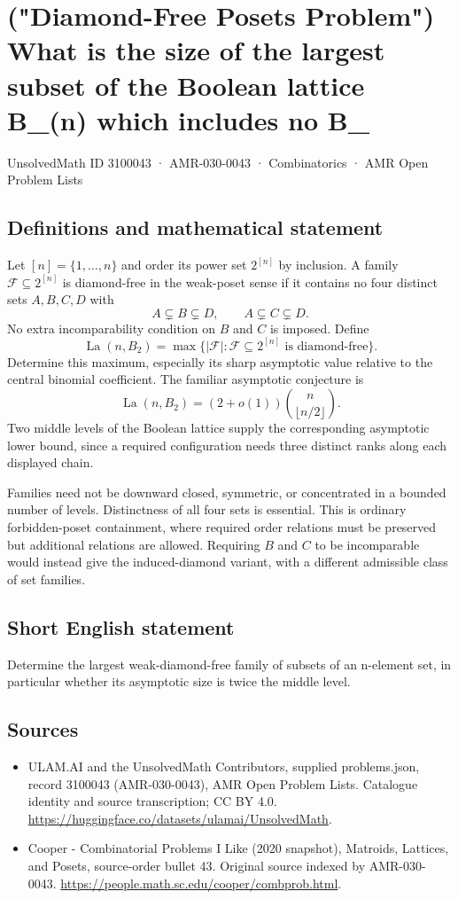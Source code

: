 \documentclass[11pt,a4paper]{article}
\begin{document}
\section*{("Diamond-Free Posets Problem") What is the size of the largest subset of the Boolean lattice B\_(n) which includes no B\_}\label{3100043}
{\small UnsolvedMath ID 3100043 · AMR-030-0043 · Combinatorics · AMR Open Problem Lists}
\subsection{Definitions and mathematical statement}
Let $[n]=\{1,\ldots,n\}$ and order its power set $2^{[n]}$ by
inclusion. A family $\mathcal F\subseteq2^{[n]}$ is diamond-free
in the weak-poset sense if it contains no four distinct sets
$A,B,C,D$ with
\[
                 A\subsetneq B\subsetneq D,
              \qquad A\subsetneq C\subsetneq D.
\]
No extra incomparability condition on $B$ and $C$ is imposed.
Define
\[
 \operatorname{La}(n,B_2)
   =\max\{|\mathcal F|:\mathcal F\subseteq2^{[n]}
                              \text{ is diamond-free}\}.
\]
Determine this maximum, especially its sharp asymptotic value
relative to the central binomial coefficient. The familiar
asymptotic conjecture is
\[
      \operatorname{La}(n,B_2)
              =(2+o(1))\binom n{\lfloor n/2\rfloor}.
\]
Two middle levels of the Boolean lattice supply the corresponding
asymptotic lower bound, since a required configuration needs
three distinct ranks along each displayed chain.

Families need not be downward closed, symmetric, or concentrated
in a bounded number of levels. Distinctness of all four sets is
essential. This is ordinary forbidden-poset containment, where
required order relations must be preserved but additional
relations are allowed. Requiring $B$ and $C$ to be incomparable
would instead give the induced-diamond variant, with a different
admissible class of set families.
\subsection{Short English statement}
Determine the largest weak-diamond-free family of subsets of an n-element set, in particular whether its asymptotic size is twice the middle level.
\subsection{Sources}
\begin{itemize}
\item[S1] ULAM.AI and the UnsolvedMath Contributors, supplied problems.json, record 3100043 (AMR-030-0043), AMR Open Problem Lists. Catalogue identity and source transcription; CC BY 4.0.
\url{https://huggingface.co/datasets/ulamai/UnsolvedMath}.
\item[S2] Cooper - Combinatorial Problems I Like (2020 snapshot), Matroids, Lattices, and Posets, source-order bullet 43. Original source indexed by AMR-030-0043.
\url{https://people.math.sc.edu/cooper/combprob.html}.
\end{itemize}
\end{document}
